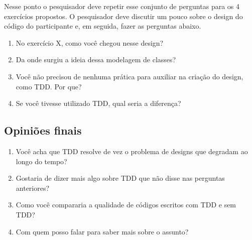 Nesse ponto o pesquisador deve repetir esse conjunto de perguntas
para os 4 exercícios propostos.
O pesquisador deve discutir um pouco sobre o design do código do participante e, em seguida,
fazer as perguntas abaixo.

\begin{enumerate}
	
	\item No exercício X, como você chegou nesse design?
	
	\item Da onde surgiu a ideia dessa modelagem de classes?
	
	\item Você não precisou de nenhuma prática para auxiliar na criação do design, como TDD. Por que?
	
	\item Se você tivesse utilizado TDD, qual seria a diferença?
	
\end{enumerate}

\subsection{Opiniões finais}

\begin{enumerate}
	\item Você acha que TDD resolve de vez o problema de designs que degradam ao longo do tempo?

	\item Gostaria de dizer mais algo sobre TDD que não disse nas perguntas anteriores?
	
	\item Como você compararia a qualidade de códigos escritos com TDD e sem TDD? 

	\item Com quem posso falar para saber mais sobre o assunto?
\end{enumerate}
